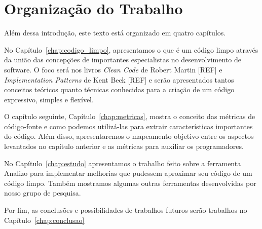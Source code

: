 \section{Organização do Trabalho}
\label{sec:organizacao_trabalho}

Além dessa introdução, este texto está organizado em quatro capítulos.

No Capítulo~\ref{chap:codigo_limpo}, apresentamos o que é um código limpo através
da união das concepções de importantes especialistas no desenvolvimento de software.
O foco será nos livros \textit{Clean Code} de Robert Martin [REF] e \textit{Implementation
Patterns} de Kent Beck [REF] e serão apresentados tantos conceitos teóricos
quanto técnicas conhecidas para a criação de um código expressivo, simples e flexível.

O capítulo seguinte, Capítulo~\ref{chap:metricas}, mostra o conceito das métricas de 
código-fonte e como podemos utilizá-las para extrair características importantes do
código. Além disso, apresentaremos o mapeamento objetivo entre os aspectos levantados
no capítulo anterior e as métricas para auxiliar os programadores.

No Capítulo~\ref{chap:estudo} apresentamos o trabalho feito sobre a ferramenta Analizo para implementar melhorias que pudessem aproximar seu código de um código limpo. Também mostramos algumas outras ferramentas desenvolvidas por nosso grupo de pesquisa.

Por fim, as conclusões e possibilidades de trabalhos futuros serão trabalhos no Capítulo~\ref{chap:conclusao}